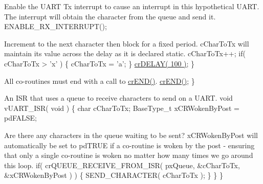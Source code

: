 \begin{DoxyPre}Enable the UART Tx interrupt to cause an interrupt in this
hypothetical UART.  The interrupt will obtain the character
from the queue and send it.
         ENABLE\_RX\_INTERRUPT();\end{DoxyPre}



\begin{DoxyPre}Increment to the next character then block for a fixed period.
cCharToTx will maintain its value across the delay as it is
declared static.
         cCharToTx++;
         if( cCharToTx > 'x' )
         \{
            cCharToTx = 'a';
         \}
         \hyperlink{croutine_8h_a05a06feb11028f2d1d440ea335f562ba}{crDELAY( 100 )};
     \}\end{DoxyPre}



\begin{DoxyPre}All co-routines must end with a call to \hyperlink{croutine_8h_ae6038cc976689b50000475ebfc4e2f23}{crEND()}.
     \hyperlink{croutine_8h_ae6038cc976689b50000475ebfc4e2f23}{crEND()};
 \}\end{DoxyPre}



\begin{DoxyPre}An ISR that uses a queue to receive characters to send on a UART.
 void vUART\_ISR( void )
 \{
 char cCharToTx;
 BaseType\_t xCRWokenByPost = pdFALSE;
\begin{DoxyVerb}while( UART_TX_REG_EMPTY() )
{
\end{DoxyVerb}

Are there any characters in the queue waiting to be sent?
xCRWokenByPost will automatically be set to pdTRUE if a co-routine
is woken by the post - ensuring that only a single co-routine is
woken no matter how many times we go around this loop.
         if( crQUEUE\_RECEIVE\_FROM\_ISR( pxQueue, &cCharToTx, &xCRWokenByPost ) )
         \{
             SEND\_CHARACTER( cCharToTx );
         \}
     \}
 \}\end{DoxyPre}
 